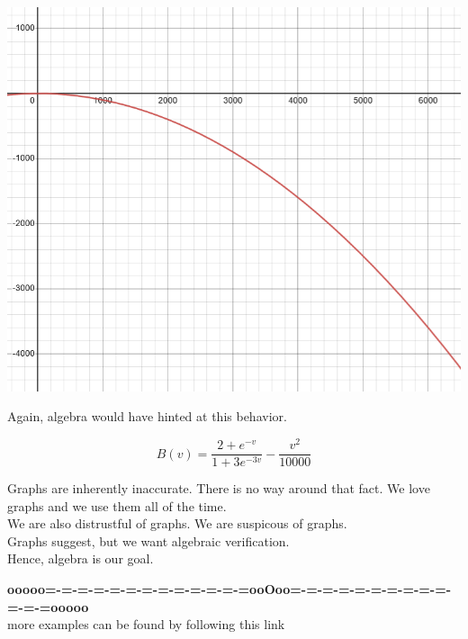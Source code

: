 \documentclass{ximera}
\begin{document}
\begin{example}
\begin{image}
\includegraphics{pics/graph_4B.png}
\end{image}





Again, algebra would have hinted at this behavior.

\[  B(v) = \frac{2+e^{-v}}{1+3 e^{-3v}} -\frac{v^2}{10000}     \]


\end{example}



Graphs are inherently inaccurate.  There is no way around that fact.  We love graphs and we use them all of the time. \\

We are also distrustful of graphs.  We are suspicous of graphs. \\

Graphs suggest, but we want algebraic verification. \\

Hence, algebra is our goal.














\begin{center}
\textbf{\textcolor{green!50!black}{ooooo=-=-=-=-=-=-=-=-=-=-=-=-=ooOoo=-=-=-=-=-=-=-=-=-=-=-=-=ooooo}} \\

more examples can be found by following this link\\ 

\end{center}
\end{document}
